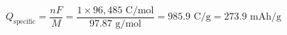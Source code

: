 \documentclass[preview]{standalone}
\begin{document}
\[Q_\text{specific} = \frac{nF}{M} = \frac{1 \times 96{,}485 \text{ C/mol}}{97.87 \text{ g/mol}} = 985.9 \text{ C/g} = 273.9 \text{ mAh/g}\]
\end{document}
